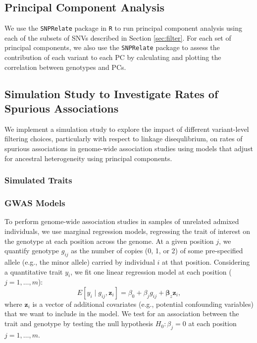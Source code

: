 \documentclass[12pt]{article}
\newcommand{\add}[1]{{\color{red}{[... #1 ...]}}}
\begin{document}
\subsection{Principal Component Analysis}
\label{sec:PCA}

We use the \texttt{SNPRelate} package in \texttt{R} to run principal component analysis using each of the subsets of SNVs described in Section \ref{sec:filter}. 
For each set of principal components, we also use the \texttt{SNPRelate} package to assess the contribution of each variant to each PC by calculating and plotting the correlation between genotypes and PCs.
\add{also look at loadings? shouldn't this give us the same picture as corr?}


\subsection{Simulation Study to Investigate Rates of Spurious Associations}

We implement a simulation study to explore the impact of different variant-level filtering choices, particularly with respect to linkage disequlibrium, on rates of spurious associations in genome-wide association studies using models that adjust for ancestral heterogeneity using principal components.

\subsubsection{Simulated Traits}

\add{
\begin{itemize}
\item find loading peaks from "naive" approach
\item simulate trait that is beta * x + rnorm(0, 1), where beta = 1 or 2 and x = genotype at one of the peaks
\end{itemize}
}

\subsubsection{GWAS Models}

To perform genome-wide association studies in samples of unrelated admixed individuals, we use marginal regression models, regressing the trait of interest on the genotype at each position across the genome. 
At a given position $j$, we quantify genotype $g_{ij}$ as the number of copies (0, 1, or 2) of some pre-specified allele (e.g., the minor allele) carried by individual $i$ at that position. 
Considering a quantitative trait $y_i$, we fit one linear regression model at each position ($j = 1, \dots, m$): $$E[y_i \mid g_{ij}, \mathbf{z}_i] = \beta_0 + \beta_j g_{ij} + \boldsymbol{\beta}_z \mathbf{z}_i,$$ where $\mathbf{z}_i$ is a vector of additional covariates (e.g., potential confounding variables) that we want to include in the model.
We test for an association between the trait and genotype by testing the null hypothesis $H_0: \beta_j = 0$ at each position $j = 1, \dots, m$.
\end{document}
